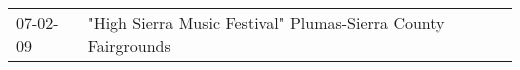\begin{supertabular}{p{0.25\columnwidth}p{0.75\columnwidth}}
 07-02-09 &  "High Sierra Music Festival" Plumas-Sierra County Fairgrounds \\
\end{supertabular}
